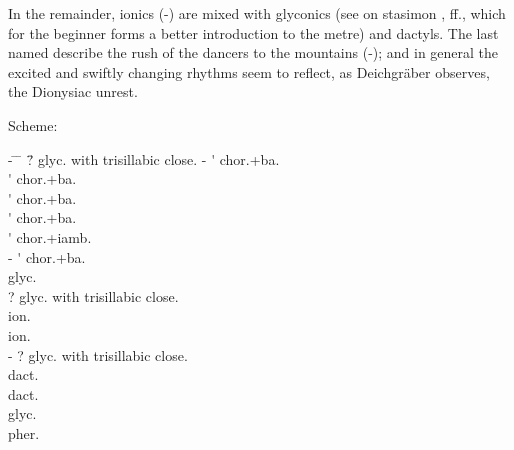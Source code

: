 \documentclass[11pt]{report}
\renewcommand{\(}{\begin{metrike}}
\renewcommand{\)}{\end{metrike}}
\begin{document}
In the remainder, ionics (-)
are mixed with glyconics (see on stasimon ,
 ff., which for the beginner forms a
better introduction to the metre) and dactyls. The last
named describe the rush of the dancers to the mountains
(-); and in general the excited and
swiftly changing rhythms seem to reflect, as Deichgr\"aber observes,
the Dionysiac unrest.
\strut\par
Scheme:
\begin{tabbing}
%
%
-\hspace{2em}
\=\metra{\m\b\b\bbm}%
\=\metra{\b\m\s\b\b\m}\hspace{3em}%
\=? glyc. with trisillabic close. \kill
%
-%
\>\>\metra{\m\b\b\m}\'\metra{\b\m\m}%
\>chor{.}+ba.\\
%
\>\>\metra{\m\b\b\m}\'\metra{\b\m\m}%
\>chor{.}+ba.\\
%
\>\>\metra{\bb\b\b\bb}\'\metra{\b\m\m}%
\>chor{.}+ba.\\
%
\>\>\metra{\m\b\b\bbm}\'\metra{\b\m\m}%
\>chor{.}+ba.\\
%
\>\>\metra{\m\b\b\m}\'\metra{\b\m\b\bb}%
\>chor{.}+iamb.\\
%
-%
\>\>\metra{\m\b\b\m}\'\metra{\b\m\m}%
\>chor{.}+ba.\\
%
\>\metra{\m\m\s\m\b\b\m\s\b\m}%
\>\>glyc.\\
%
\>\metra{\bb\b\s\m\b\b\m\s\b\b\m}%
\>\>? glyc. with trisillabic close. \\
%
\>\metra{\m\m\m\s\b\b\m\m\s\b\b\m\m}%
\>\> ion.\\
%
\>\metra{\bb\m\m\s\b\b\m\m\s\b\b\m\m}%
\>\> ion.\\
%
-%
\>\metra{\bb\b\s\m\b\b\m\s\b\b\m}%
\>\>? glyc. with trisillabic close. \\
%
\>\metra{\m\b\b\s\m\b\b\s\m\b\b\s\m\K\m}%
\>\> dact.\\
%
\>\metra{\m\b\b\s\m\b\b}%
\>\> dact.\\
%
\>\metra{\b\m\s\m\b\b\m\s\b\m}%
\>\>glyc.\\
%
\>\metra{\m\m\s\m\b\b\m\s\m}%
\>\>pher.\\
\end{tabbing}
\end{document}
